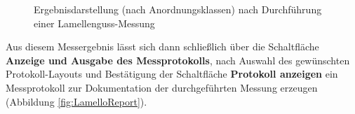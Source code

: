 \documentclass[
fontsize=10pt, 
listof = totoc,
parskip = half	
]{report}
\begin{document}
\begin{figure}[H]
	\centering
	\caption{Ergebnisdarstellung (nach Anordnungsklassen) nach Durchführung einer Lamellenguss-Messung}
	\label{fig:LamelloResultArrangementClasses}
\end{figure}

\noindent Aus diesem Messergebnis lässt sich dann schließlich über die Schaltfläche \textbf{\glqq Anzeige und Ausgabe des Messprotokolls\grqq}, nach Auswahl des gewünschten Protokoll-Layouts und Bestätigung der Schaltfläche \textbf{\glqq Protokoll anzeigen\grqq} ein Messprotokoll zur Dokumentation der durchgeführten Messung erzeugen (Abbildung \ref{fig:LamelloReport}).
\end{document}
